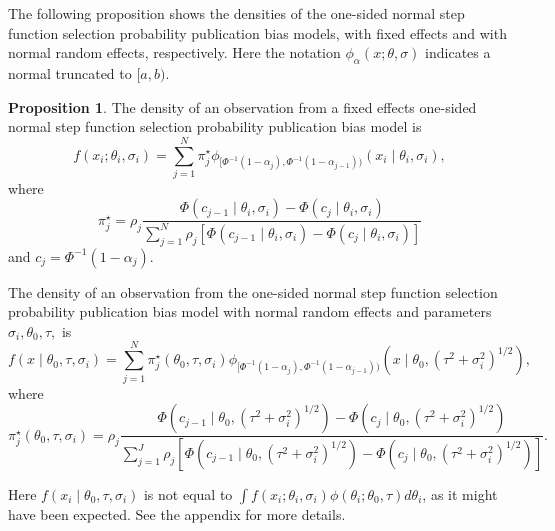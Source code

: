 \documentclass{article}
\theoremstyle{plain}
\theoremstyle{definition}
\newtheorem{prop}[theorem]{Proposition}
\renewcommand{\sqrt}[1]{(#1)^{1/2}}
\begin{document}
The following proposition shows the densities of the one-sided normal step function selection probability publication bias models, with fixed effects and with normal random effects, respectively. Here the notation $\phi_{\alpha}(x;\theta,\sigma)$ indicates a normal truncated to $[a,b)$.
\begin{prop}
\label{prop:One-sided normal discrete probability vector publication bias model-1}
The density of an observation from a fixed effects one-sided normal step function selection probability publication bias model is
\begin{equation}\label{eq:Fixed effects, publication bias}
f(x_{i};\theta_{i},\sigma_{i}) = \sum_{j=1}^{N}\pi_{j}^\star\phi_{[\Phi^{-1}(1-\alpha_{j}),\Phi^{-1}(1-\alpha_{j-1}))}(x_{i}\mid\theta_{i},\sigma_{i}),
\end{equation}
where
$$
\pi_{j}^{\star}=\rho_{j}\frac{\Phi(c_{j-1}\mid\theta_{i},\sigma_{i})-\Phi(c_{j}\mid\theta_{i},\sigma_{i})}{\sum_{j=1}^{N}\rho_{j}\left[\Phi(c_{j-1}\mid\theta_{i},\sigma_{i})-\Phi(c_{j}\mid\theta_{i},\sigma_{i})\right]}
$$
and $c_{j}=\Phi^{-1}(1-\alpha_{j})$.

The density of an observation from the one-sided normal step function selection probability publication bias model with normal random effects and parameters $\sigma_{i},\theta_{0},\tau,$ is
\begin{equation}\label{eq:Random effects, publication bias}
f(x\mid\theta_{0},\tau,\sigma_{i})=\sum_{j=1}^{N}\pi_{j}^{\star}(\theta_0,\tau,\sigma_{i})\phi_{[\Phi^{-1}(1-\alpha_{j}),\Phi^{-1}(1-\alpha_{j-1}))}(x\mid\theta_{0},\sqrt{\tau^{2}+\sigma_{i}^{2}}),
\end{equation}
where 
\[
\pi_{j}^{\star}(\theta_0,\tau,\sigma_{i})=\rho_{j}\frac{\Phi(c_{j-1}\mid\theta_{0},\sqrt{\tau^{2}+\sigma_{i}^{2}})-\Phi(c_{j}\mid\theta_{0},\sqrt{\tau^{2}+\sigma_{i}^{2}})}{\sum_{j=1}^{J}\rho_{j}\left[\Phi(c_{j-1}\mid\theta_{0},\sqrt{\tau^{2}+\sigma_{i}^{2}})-\Phi(c_{j}\mid\theta_{0},\sqrt{\tau^{2}+\sigma_{i}^{2}})\right]}.
\]
\end{prop}

Here $f(x_i\mid\theta_{0},\tau,\sigma_i)$ is not equal to $\int f(x_{i};\theta_{i},\sigma_{i})\phi(\theta_{i};\theta_{0},\tau)d\theta_{i}$,
as it might have been expected. See the appendix for more details.
\end{document}
